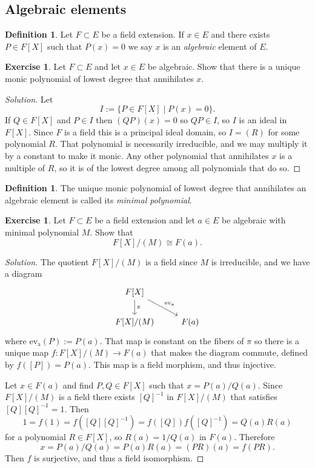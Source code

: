 \documentclass[11pt]{amsart}
\theoremstyle{definition}
\newtheorem{defi}[theo]{Definition}
\newtheorem{e}[theo]{Exercise}
\newenvironment{s}{\begin{proof}[Solution]}{\end{proof}}
\begin{document}
\subsection*{Algebraic elements}


\begin{defi}
Let $F \subset E$ be a field extension.
If $x \in E$ and there exists $P \in F[X]$ such that $P(x) = 0$ we say $x$ is an \emph{algebraic} element of $E$.
\end{defi}


\begin{e}
Let $F \subset E$ and let $x \in E$ be algebraic.
Show that there is a unique monic polynomial of lowest degree that annihilates $x$.
\end{e}

\begin{s}
Let
\[
I := \{ P \in F[X] \mid P(x) = 0 \}.
\]
If $Q \in F[X]$ and $P \in I$ then $(QP)(x) = 0$ so $QP \in I$, so $I$ is an ideal in $F[X]$.
Since $F$ is a field this is a principal ideal domain, so $I = (R)$ for some polynomial $R$.
That polynomial is necessarily irreducible, and we may multiply it by a constant to make it monic.
Any other polynomial that annihilates $x$ is a multiple of $R$, so it is of the lowest degree among all polynomials that do so.
\end{s}


\begin{defi}
The unique monic polynomial of lowest degree that annihilates an algebraic element is called its \emph{minimal polynomial}.
\end{defi}


\begin{e}
Let $F \subset E$ be a field extension and let $a \in E$ be algebraic with minimal polynomial $M$.
Show that
\[
F[X]/(M) \cong F(a).
\]
\end{e}

\begin{s}
The quotient $F[X]/(M)$ is a field since $M$ is irreducible, and we have a diagram
\[
\begin{tikzcd}
F[X] \ar[d,"\pi"] \ar[dr,"\operatorname{ev_a}"] &
\\
F[X]/(M) & F(a)
\end{tikzcd}
\]
where $\operatorname{ev_a}(P) := P(a)$.
That map is constant on the fibers of $\pi$ so there is a unique map $f : F[X]/(M) \to F(a)$ that makes the diagram commute, defined by $f([P]) = P(a)$.
This map is a field morphism, and thus injective.

Let $x \in F(a)$ and find $P,Q \in F[X]$ such that $x = P(a) / Q(a)$.
Since $F[X]/(M)$ is a field there exists $[Q]^{-1}$ in $F[X]/(M)$ that satisfies $[Q] [Q]^{-1} = 1$.
Then
\[
1 = f(1)
= f([Q] [Q]^{-1})
= f([Q]) f([Q]^{-1})
= Q(a) R(a)
\]
for a polynomial $R \in F[X]$, so $R(a) = 1/Q(a)$ in $F(a)$.
Therefore 
\[
x = P(a)/Q(a) = P(a)R(a) = (PR)(a) = f(PR).
\]
Then $f$ is surjective, and thus a field isomorphism.
\end{s}
\end{document}
